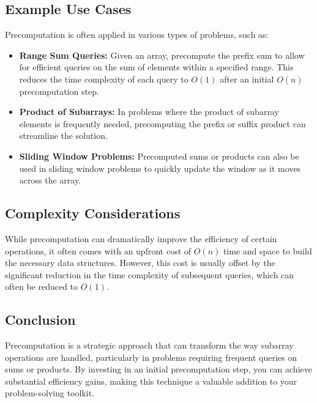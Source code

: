 \subsection*{Example Use Cases}

Precomputation is often applied in various types of problems, such as:

\begin{itemize}
    \item \textbf{Range Sum Queries:} Given an array, precompute the prefix sum to allow for efficient queries on the sum of elements within a specified range. This reduces the time complexity of each query to \(O(1)\) after an initial \(O(n)\) precomputation step.
    \item \textbf{Product of Subarrays:} In problems where the product of subarray elements is frequently needed, precomputing the prefix or suffix product can streamline the solution.
    \item \textbf{Sliding Window Problems:} Precomputed sums or products can also be used in sliding window problems to quickly update the window as it moves across the array.
\end{itemize}

\subsection*{Complexity Considerations}

While precomputation can dramatically improve the efficiency of certain operations, it often comes with an upfront cost of \(O(n)\) time and space to build the necessary data structures. However, this cost is usually offset by the significant reduction in the time complexity of subsequent queries, which can often be reduced to \(O(1)\).

\subsection*{Conclusion}

Precomputation is a strategic approach that can transform the way subarray operations are handled, particularly in problems requiring frequent queries on sums or products. By investing in an initial precomputation step, you can achieve substantial efficiency gains, making this technique a valuable addition to your problem-solving toolkit.